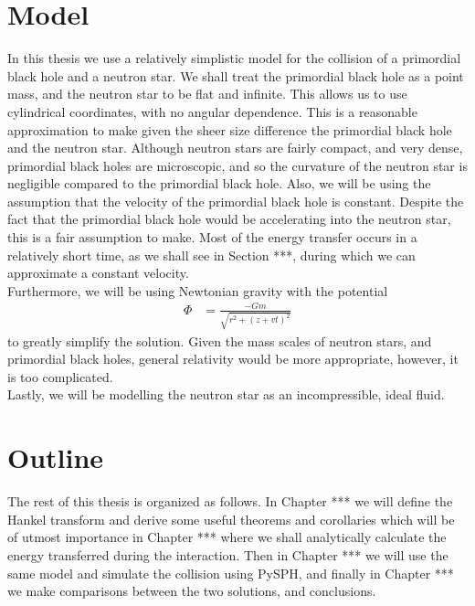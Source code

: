 \section{Model}

In this thesis we use a relatively simplistic model for the collision of a primordial black hole and a neutron star. We shall treat the primordial black hole as a point mass, and the neutron star to be flat and infinite. This allows us to use cylindrical coordinates, with no angular dependence. This is a reasonable approximation to make given the sheer size difference the primordial black hole and the neutron star. Although neutron stars are fairly compact, and very dense, primordial black holes are microscopic, and so the curvature of the neutron star is negligible compared to the primordial black hole. Also, we will be using the assumption that the velocity of the primordial black hole is constant. Despite the fact that the primordial black hole would be accelerating into the neutron star, this is a fair assumption to make. Most of the energy transfer occurs in a relatively short time, as we shall see in Section ***, during which we can approximate a constant velocity. \\

Furthermore, we will be using Newtonian gravity with the potential
\begin{align}
\label{eq:gravity}
\Phi &= \frac{-Gm}{\sqrt{r^2 + (z + vt)^2}}
\end{align}
to greatly simplify the solution. Given the mass scales of neutron stars, and primordial black holes, general relativity would be more appropriate, however, it is too complicated. \\

Lastly, we will be modelling the neutron star as an incompressible, ideal fluid.

\section{Outline}

The rest of this thesis is organized as follows. In Chapter *** we will define the Hankel transform and derive some useful theorems and corollaries which will be of utmost importance in Chapter *** where we shall analytically calculate the energy transferred during the interaction. Then in Chapter *** we will use the same model and simulate the collision using PySPH, and finally in Chapter *** we make comparisons between the two solutions, and conclusions.


%
